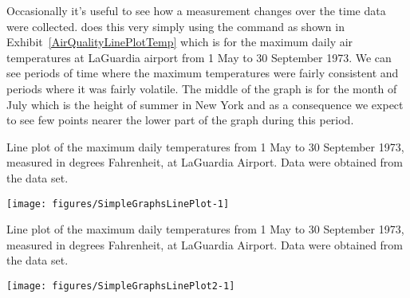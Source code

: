 Occasionally it's useful to see how a measurement changes over the time data were collected. \R{} does this very simply using the  command as shown in Exhibit~\ref{AirQualityLinePlotTemp} which is for the maximum daily air temperatures at LaGuardia airport from 1 May to 30 September 1973. We can see periods of time where the maximum temperatures were fairly consistent and periods where it was fairly volatile. The middle of the graph is for the month of July which is the height of summer in New York and as a consequence we expect to see few points nearer the lower part of the graph during this period. 
\begin{exhibit} 
\begin{center} 
\caption{Line plot of the maximum daily temperatures from 1 May to 30 September 1973, measured in degrees Fahrenheit, at LaGuardia Airport. Data were obtained from the  data set.} 
\label{AirQualityLinePlotTemp} 
\begin{knitrout}
\color{fgcolor}\begin{kframe}
\begin{alltt}
\hlstd{> } \hlstd{=}\hlstd{(}\hlstd{,}\hlstd{))}
\end{alltt}
\end{kframe}
\texttt{[image: figures/SimpleGraphsLinePlot-1]} 

\end{knitrout}
\end{center} 
\end{exhibit} 
\begin{exhibit} 
\begin{center} 
\caption{Line plot of the maximum daily temperatures from 1 May to 30 September 1973, measured in degrees Fahrenheit, at LaGuardia Airport. Data were obtained from the  data set.} 
\label{AirQualityLinePlotTemp2} 
\begin{knitrout}
\color{fgcolor}\begin{kframe}
\begin{alltt}
\hlstd{> } \hlstd{=}\hlstd{(}\hlstd{,}\hlstd{),} \hlstd{=}\hlstd{)}
\end{alltt}
\end{kframe}
\texttt{[image: figures/SimpleGraphsLinePlot2-1]} 

\end{knitrout}
\end{center} 
\end{exhibit} 
 
